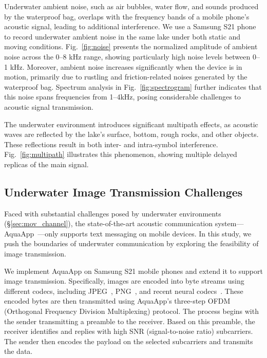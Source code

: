  Underwater ambient noise, such as air bubbles, water flow, and sounds produced by the waterproof bag, overlaps with the frequency bands of a mobile phone's acoustic signal, leading to additional interference.
We use a Samsung S21 phone to record underwater ambient noise in the same lake
under both static and moving conditions.
Fig.~\ref{fig:noise} presents the normalized amplitude of ambient noise across the
0--8 kHz range, showing particularly high noise levels between 0--1 kHz.
Moreover, ambient noise increases significantly when the device is in motion,
primarily due to rustling and friction-related noises generated by the waterproof
bag.
Spectrum analysis in Fig.~\ref{fig:spectrogram} further indicates that this noise
spans frequencies from 1--4kHz, posing considerable challenges to acoustic
signal transmission.

 The underwater environment introduces significant multipath effects,
as acoustic waves are reflected by the lake's surface, bottom, rough rocks, and other
objects. These reflections result in both inter- and intra-symbol interference.
Fig.~\ref{fig:multipath} illustrates this phenomenon, showing multiple delayed replicas
of the main signal.





\subsection{Underwater Image Transmission Challenges}\label{sec:mov_challenges}

Faced with substantial challenges posed by underwater
environments (\S\ref{sec:mov_channel}), the state-of-the-art acoustic
communication system---AquaApp~\cite{chen2022underwater}---only supports text
messaging on mobile devices.
In this study, we push the boundaries of underwater communication by
exploring the feasibility of image transmission.



We implement AquaApp on Samsung S21 mobile phones and extend it to support
image transmission. Specifically, images are encoded into byte streams
using different codecs, including
JPEG~\cite{wallace1991jpeg}, PNG~\cite{PNG}, and recent neural
codecs~\cite{cheng2020image}. These encoded bytes are then transmitted
using AquaApp's three-step OFDM (Orthogonal Frequency Division Multiplexing)
protocol. The process begins with the sender transmitting a preamble to the
receiver. Based on this preamble, the receiver identifies and replies with high
SNR (signal-to-noise ratio) subcarriers.
The sender then encodes the payload on the selected subcarriers and transmits
the data.


